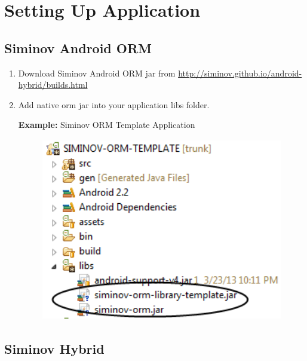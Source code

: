 \newpage
\chapter {\Large{Setting Up Application}}


\section{Siminov Android ORM}


\begin{enumerate}

	\item \small Download Siminov Android ORM jar from \url{http://siminov.github.io/android-hybrid/builds.html}

	\item \small Add native orm jar into your application libs folder.

		\par
		\textbf{Example:} Siminov ORM Template Application
		\begin{figure}[htbp]
			\centering
				\includegraphics[height=8cm]{Resources/siminov_template_application_add_siminov_jar.png}
		\end{figure}	


\end{enumerate}




\section{Siminov Hybrid}

